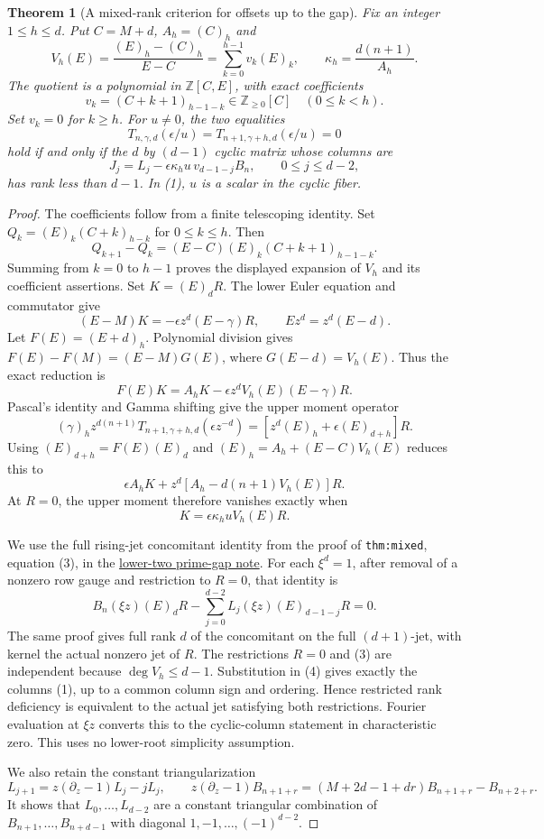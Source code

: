 \documentclass[11pt]{article}
\newtheorem{theorem}{Theorem}
\begin{document}
\begin{theorem}[A mixed-rank criterion for offsets up to the gap]
\label{thm:offset-rank}
Fix an integer $1\le h\le d$. Put $C=M+d$, $A_h=(C)_h$ and
\[
 V_h(E)=\frac{(E)_h-(C)_h}{E-C}
       =\sum_{k=0}^{h-1}v_k(E)_k,\qquad
 \kappa_h=\frac{d(n+1)}{A_h}.
\]
The quotient is a polynomial in $\mathbb Z[C,E]$, with exact coefficients
\[
 v_k=(C+k+1)_{h-1-k}\in\mathbb Z_{\ge0}[C]\quad(0\le k<h).
\]
Set $v_k=0$ for $k\ge h$.
For $u\ne0$, the two equalities
\[
 T_{n,\gamma,d}(\epsilon/u)
  =T_{n+1,\gamma+h,d}(\epsilon/u)=0
\]
hold if and only if the $d$ by $(d-1)$ cyclic matrix whose columns are
\[
 J_j=L_j-\epsilon\kappa_h u\,v_{d-1-j}B_n,
                \qquad 0\le j\le d-2,                         \tag{1}
\]
has rank less than $d-1$. In (1), $u$ is a scalar in the cyclic fiber.
\end{theorem}
\begin{proof}
The coefficients follow from a finite telescoping identity.
Set $Q_k=(E)_k(C+k)_{h-k}$ for $0\le k\le h$.
Then
\[
 Q_{k+1}-Q_k=(E-C)(E)_k(C+k+1)_{h-1-k}.
\]
Summing from $k=0$ to $h-1$ proves the displayed expansion of $V_h$
and its coefficient assertions.
Set $K=(E)_dR$. The lower Euler equation and commutator give
\[
 (E-M)K=-\epsilon z^d(E-\gamma)R,\qquad
 Ez^d=z^d(E-d).
\]
Let $F(E)=(E+d)_h$. Polynomial division gives
$F(E)-F(M)=(E-M)G(E)$, where $G(E-d)=V_h(E)$.
Thus the exact reduction is
\[
 F(E)K=A_hK-\epsilon z^dV_h(E)(E-\gamma)R.
\]
Pascal's identity and Gamma shifting give the upper moment operator
\[
 (\gamma)_h z^{d(n+1)}T_{n+1,\gamma+h,d}(\epsilon z^{-d})
       =[z^d(E)_h+\epsilon(E)_{d+h}]R.
\]
Using $(E)_{d+h}=F(E)(E)_d$ and
$(E)_h=A_h+(E-C)V_h(E)$ reduces this to
\[
 \epsilon A_hK+
 z^d[A_h-d(n+1)V_h(E)]R.                                  \tag{2}
\]
At $R=0$, the upper moment therefore vanishes exactly when
\[
 K=\epsilon\kappa_h u V_h(E)R.                             \tag{3}
\]

We use the full rising-jet concomitant identity from the proof of
\texttt{thm:mixed}, equation (3), in the
\href{LOWER_TWO_PRIME_GAP_SFC.tex}{lower-two prime-gap note}.
For each $\xi^d=1$, after removal of a nonzero row gauge and
restriction to $R=0$, that identity is
\[
 B_n(\xi z)(E)_dR-
 \sum_{j=0}^{d-2}L_j(\xi z)(E)_{d-1-j}R=0.                 \tag{4}
\]
The same proof gives full rank $d$ of the concomitant on the full
$(d+1)$-jet, with kernel the actual nonzero jet of $R$.
The restrictions $R=0$ and (3) are independent because
$\deg V_h\le d-1$. Substitution in (4) gives exactly the columns
(1), up to a common column sign and ordering. Hence restricted
rank deficiency is equivalent to the actual jet satisfying both
restrictions. Fourier evaluation at $\xi z$ converts this to the
cyclic-column statement in characteristic zero.
This uses no lower-root simplicity assumption.

We also retain the constant triangularization
\[
 L_{j+1}=z(\partial_z-1)L_j-jL_j,\qquad
 z(\partial_z-1)B_{n+1+r}
  =(M+2d-1+dr)B_{n+1+r}-B_{n+2+r}.                         \tag{5}
\]
It shows that $L_0,\ldots,L_{d-2}$ are a constant triangular
combination of $B_{n+1},\ldots,B_{n+d-1}$ with diagonal
$1,-1,\ldots,(-1)^{d-2}$.
\end{proof}
\end{document}
